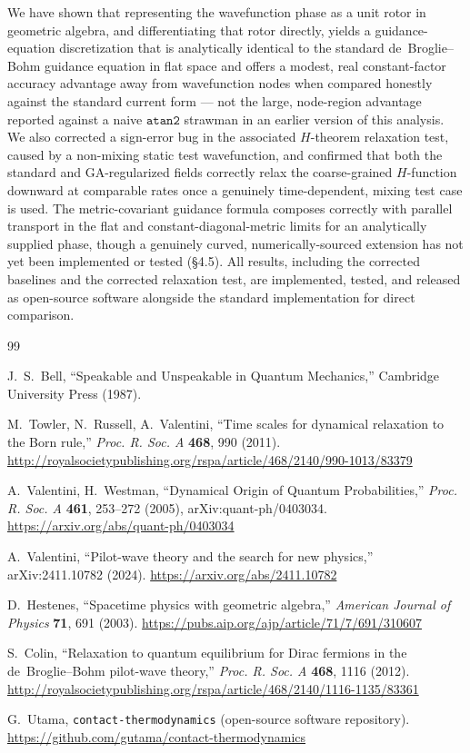 \documentclass[11pt]{article}
\begin{document}
We have shown that representing the wavefunction phase as a unit rotor in geometric algebra, and differentiating that rotor directly, yields a guidance-equation discretization that is analytically identical to the standard de~Broglie--Bohm guidance equation in flat space and offers a modest, real constant-factor accuracy advantage away from wavefunction nodes when compared honestly against the standard current form — not the large, node-region advantage reported against a naive $\mathtt{atan2}$ strawman in an earlier version of this analysis. We also corrected a sign-error bug in the associated $H$-theorem relaxation test, caused by a non-mixing static test wavefunction, and confirmed that both the standard and GA-regularized fields correctly relax the coarse-grained $H$-function downward at comparable rates once a genuinely time-dependent, mixing test case is used. The metric-covariant guidance formula composes correctly with parallel transport in the flat and constant-diagonal-metric limits for an analytically supplied phase, though a genuinely curved, numerically-sourced extension has not yet been implemented or tested (\S4.5). All results, including the corrected baselines and the corrected relaxation test, are implemented, tested, and released as open-source software alongside the standard implementation for direct comparison.


\begin{thebibliography}{99}

J.~S.~Bell, ``Speakable and Unspeakable in Quantum Mechanics,'' Cambridge University Press (1987).

M.~Towler, N.~Russell, A.~Valentini, ``Time scales for dynamical relaxation to the Born rule,'' \textit{Proc. R. Soc. A} \textbf{468}, 990 (2011). \url{http://royalsocietypublishing.org/rspa/article/468/2140/990-1013/83379}

A.~Valentini, H.~Westman, ``Dynamical Origin of Quantum Probabilities,'' \textit{Proc. R. Soc. A} \textbf{461}, 253--272 (2005), arXiv:quant-ph/0403034. \url{https://arxiv.org/abs/quant-ph/0403034}

A.~Valentini, ``Pilot-wave theory and the search for new physics,'' arXiv:2411.10782 (2024). \url{https://arxiv.org/abs/2411.10782}

D.~Hestenes, ``Spacetime physics with geometric algebra,'' \textit{American Journal of Physics} \textbf{71}, 691 (2003). \url{https://pubs.aip.org/ajp/article/71/7/691/310607}

S.~Colin, ``Relaxation to quantum equilibrium for Dirac fermions in the de~Broglie--Bohm pilot-wave theory,'' \textit{Proc. R. Soc. A} \textbf{468}, 1116 (2012). \url{http://royalsocietypublishing.org/rspa/article/468/2140/1116-1135/83361}

G.~Utama, \texttt{contact-thermodynamics} (open-source software repository). \url{https://github.com/gutama/contact-thermodynamics}

\end{thebibliography}
\end{document}
